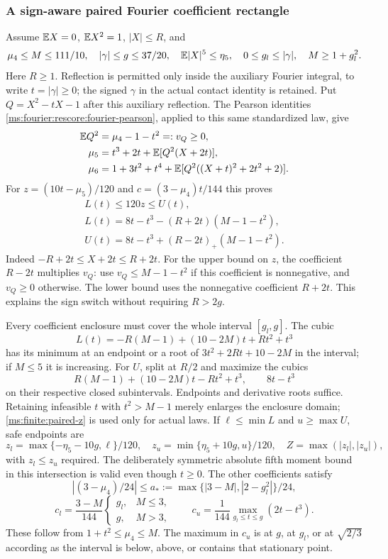 \subsubsection{A sign-aware paired Fourier coefficient rectangle}
\label{ms:finite:paired-rectangle}
Assume $\mathbb E X=0$, $\mathbb E X^2=1$, $|X|\le R$, and
\[
 \mu_4\le M\le111/10,\quad |\gamma|\le g\le37/20,
 \quad \mathbb E|X|^5\le\eta_5,\quad
 0\le g_l\le|\gamma|,\quad M\ge1+g_l^2.
\]
Here $R\ge1$. Reflection is permitted only inside the auxiliary Fourier
integral, to write $t=|\gamma|\ge0$; the signed $\gamma$ in the actual
contact identity is retained. Put $Q=X^2-tX-1$ after this auxiliary
reflection. The Pearson identities
\eqref{ms:fourier:rescore:fourier-pearson}, applied to this same
standardized law, give
\begin{align}
 \mathbb E Q^2&=\mu_4-1-t^2=:v_Q\ge0,\notag\\
 \mu_5&=t^3+2t+\mathbb E[Q^2(X+2t)],\notag\\
 \mu_6&=1+3t^2+t^4+
   \mathbb E[Q^2((X+t)^2+2t^2+2)].
 \label{ms:finite:pearson-identities}
\end{align}
For $z=(10t-\mu_5)/120$ and $c=(3-\mu_4)t/144$ this proves
\begin{equation}
 \begin{gathered}
 L(t)\le120z\le U(t),\\
 L(t)=8t-t^3-(R+2t)(M-1-t^2),\\
 U(t)=8t-t^3+(R-2t)_+(M-1-t^2).
 \end{gathered}
 \label{ms:finite:paired-z}
\end{equation}
Indeed $-R+2t\le X+2t\le R+2t$. For the upper bound on $z$, the
coefficient $R-2t$ multiplies $v_Q$: use $v_Q\le M-1-t^2$ if this
coefficient is nonnegative, and $v_Q\ge0$ otherwise. The lower bound
uses the nonnegative coefficient $R+2t$. This explains the sign switch
without requiring $R>2g$.

Every coefficient enclosure must cover the whole interval $[g_l,g]$.
The cubic
\[
 L(t)=-R(M-1)+(10-2M)t+Rt^2+t^3
\]
has its minimum at an endpoint or a root of
$3t^2+2Rt+10-2M$ in the interval; if $M\le5$ it is increasing.
For $U$, split at $R/2$ and maximize the cubics
\[
 R(M-1)+(10-2M)t-Rt^2+t^3,\qquad 8t-t^3
\]
on their respective closed subintervals. Endpoints and derivative roots
suffice. Retaining infeasible $t$ with $t^2>M-1$ merely enlarges the
enclosure domain; \eqref{ms:finite:paired-z} is used only for actual laws.
If $\ell\le\min L$ and $u\ge\max U$, safe endpoints are
\[
 z_l=\max\{-\eta_5-10g,\ell\}/120,\quad
 z_u=\min\{\eta_5+10g,u\}/120,\quad
 Z=\max(|z_l|,|z_u|),
\]
with $z_l\le z_u$ required. The deliberately symmetric absolute fifth
moment bound in this intersection is valid even though $t\ge0$.
The other coefficients satisfy
\[
 |(3-\mu_4)/24|\le a_*:=\max\{|3-M|,|2-g_l^2|\}/24,
\]
\[
 c_l=\frac{3-M}{144}
 \begin{cases}g_l,&M\le3,\\g,&M>3,\end{cases}
 \qquad c_u=\frac1{144}\max_{g_l\le t\le g}(2t-t^3).
\]
These follow from $1+t^2\le\mu_4\le M$. The maximum in $c_u$ is
at $g$, at $g_l$, or at $\sqrt{2/3}$ according as the interval is
below, above, or contains that stationary point.

